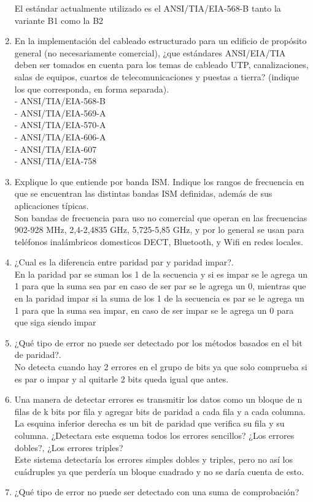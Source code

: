 \documentclass{udparticle}
\begin{document}
\begin{enumerate}
El estándar actualmente utilizado es el ANSI/TIA/EIA-568-B tanto la variante B1 como la B2\\
\item En la implementación del cableado estructurado para un edificio de propósito general (no necesariamente comercial), ¿que estándares ANSI/EIA/TIA deben ser tomados en cuenta para los temas de cableado UTP, canalizaciones, salas de equipos, cuartos de telecomunicaciones y puestas a tierra? (indique los que corresponda, en forma separada).\\
- ANSI/TIA/EIA-568-B\\
- ANSI/TIA/EIA-569-A\\
- ANSI/TIA/EIA-570-A\\
- ANSI/TIA/EIA-606-A\\
- ANSI/TIA/EIA-607\\
- ANSI/TIA/EIA-758\\
\item Explique lo que entiende por banda ISM. Indique los rangos de frecuencia en que se encuentran las distintas bandas ISM definidas, además de sus aplicaciones típicas.\\
Son bandas de frecuencia para uso no comercial que operan en las frecuencias 902-928 MHz, 2,4-2,4835 GHz, 5,725-5,85 GHz, y por lo general se usan para teléfonos inalámbricos domesticos DECT, Bluetooth, y Wifi en redes locales.\\
\item  ¿Cual es la diferencia entre paridad par y paridad impar?.\\
En la paridad par se suman los 1 de la secuencia y si es impar se le agrega un 1 para que la suma sea par en caso de ser par se le agrega un 0, mientras que en la paridad impar si la suma de los 1 de la secuencia es par se le agrega un 1 para que la suma sea impar, en caso de ser impar se le agrega un 0 para que siga siendo impar\\
\item ¿Qué tipo de error no puede ser detectado por los métodos basados en el bit de paridad?.\\
No detecta cuando hay 2 errores en el grupo de bits ya que solo comprueba si es par o impar y al quitarle 2 bits queda igual que antes.\\
\item Una manera de detectar errores es transmitir los datos como un bloque de n filas de k bits por fila y agregar bits de paridad a cada fila y a cada columna. La esquina inferior derecha es un bit de paridad que verifica su fila y su columna. ¿Detectara este esquema todos los errores sencillos? ¿Los errores dobles?, ¿Los errores triples?\\
Este sistema detectaría los errores simples dobles y triples, pero no así los cuádruples ya que perdería un bloque cuadrado y no se daría cuenta de esto.\\
\item  ¿Qué tipo de error no puede ser detectado con una suma de comprobación?\\



  
  
    
    
\end{enumerate}
\end{document}
